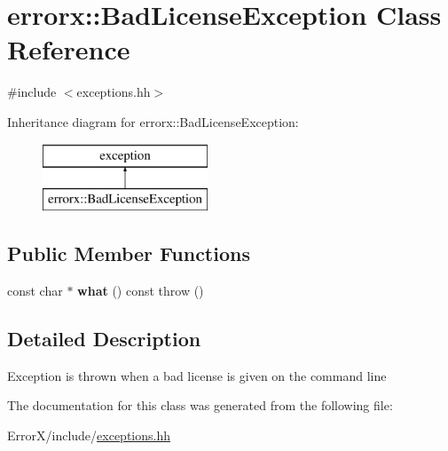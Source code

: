 \hypertarget{classerrorx_1_1_bad_license_exception}{}\section{errorx\+::Bad\+License\+Exception Class Reference}
\label{classerrorx_1_1_bad_license_exception}


{\ttfamily \#include $<$exceptions.\+hh$>$}

Inheritance diagram for errorx\+::Bad\+License\+Exception\+:\begin{figure}[H]
\begin{center}
\leavevmode
\includegraphics[height=2.000000cm]{classerrorx_1_1_bad_license_exception}
\end{center}
\end{figure}
\subsection*{Public Member Functions}
\begin{DoxyCompactItemize}
\item 
\mbox{\label{classerrorx_1_1_bad_license_exception_a31be39f57ad0e8bd84416a9792c80f21}} 
const char $\ast$ {\bfseries what} () const  throw ()
\end{DoxyCompactItemize}


\subsection{Detailed Description}
Exception is thrown when a bad license is given on the command line 

The documentation for this class was generated from the following file\+:\begin{DoxyCompactItemize}
\item 
Error\+X/include/\mbox{\hyperlink{exceptions_8hh}{exceptions.\+hh}}\end{DoxyCompactItemize}
